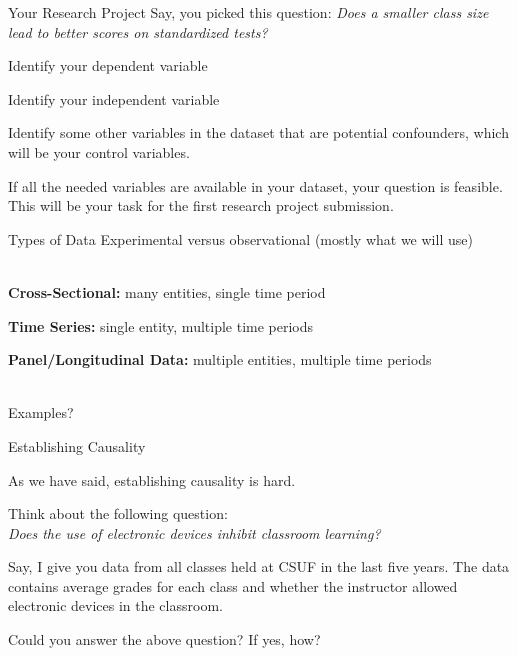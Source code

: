 \documentclass{./../div_teaching_slides}
\begin{document}
\begin{frame}{Your Research Project}
\vspace{-0.5em}
Say, you picked this question: \textit{Does a smaller class size lead to better scores on standardized tests?} \\ \vspace{0.25em}
\begin{witemize}
\item Identify your dependent variable
\item Identify your independent variable
\item Identify some other variables in the dataset that are potential confounders, which will be your control variables. \\  \vspace{0.5em}
\end{witemize}
If all the needed variables are available in your dataset, your question is feasible. \\ \vspace{0.5em}
This will be your task for the first research project submission.
\end{frame}

\begin{frame}{Types of Data}
Experimental versus observational (mostly what we will use) \\~\\
\begin{witemize}
\item \textbf{Cross-Sectional:} many entities, single time period
\item \textbf{Time Series:} single entity, multiple time periods 
\item \textbf{Panel/Longitudinal Data:} multiple entities, multiple time periods \\~\\
\end{witemize}
Examples?
\end{frame}

\begin{frame}{Establishing Causality}
\begin{witemize}
  \item As we have said, establishing causality is hard. 
  \item Think about the following question: \\ \vspace{0.5em}
  \textit{Does the use of electronic devices inhibit classroom learning?}
  \item Say, I give you data from all classes held at CSUF in the last five years. The data contains average grades for each class and whether the instructor allowed electronic devices in the classroom. 
  \item Could you answer the above question? If yes, how?
\end{witemize}
\end{frame}
\end{document}
